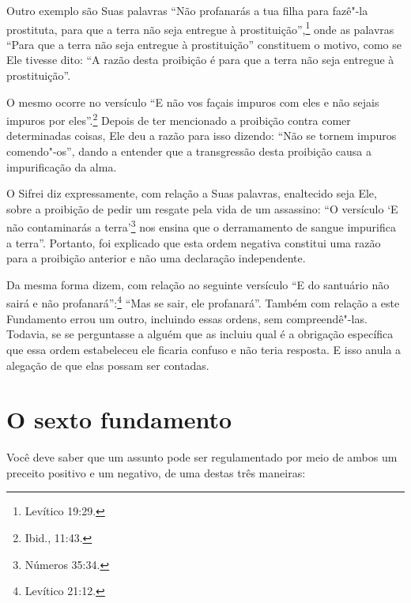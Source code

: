 Outro exemplo são Suas palavras ``Não profanarás a tua filha para
fazê"-la prostituta, para que a terra não seja entregue à prostituição'',\footnote{Levítico 19:29.} onde as palavras ``Para que a terra não seja entregue
à prostituição'' constituem o motivo, como se Ele tivesse dito: ``A
razão desta proibição é para que a terra não seja entregue à
prostituição''.

O mesmo ocorre no versículo ``E não vos façais impuros com eles e não
sejais impuros por eles''.\footnote{Ibid., 11:43.} Depois de ter mencionado a
proibição contra comer determinadas coisas, Ele deu a razão para isso
dizendo: ``Não se tornem impuros comendo"-os'', dando a entender que a
transgressão desta proibição causa a impurificação da alma.

O Sifrei\starr{} diz expressamente, com relação a Suas palavras, enaltecido seja
Ele, sobre a proibição de pedir um resgate pela vida de um assassino:
``O versículo `E não contaminarás a terra'\footnote{Números 35:34.} nos ensina
que o derramamento de sangue impurifica a terra''. Portanto, foi
explicado que esta ordem negativa constitui uma razão para a proibição
anterior e não uma declaração independente.


Da mesma forma dizem, com relação ao seguinte versículo ``E do
santuário não sairá e não profanará'':\footnote{Levítico 21:12.} ``Mas se sair,
ele profanará''.
Também com relação a este Fundamento errou um outro, incluindo essas
ordens, sem compreendê"-las. Todavia, se se perguntasse a alguém que as
incluiu qual é a obrigação específica que essa ordem estabeleceu ele
ficaria confuso e não teria resposta. E isso anula a alegação de que
elas possam ser contadas.

\chapter*{O sexto fundamento}

Você deve saber que um assunto pode ser regulamentado por meio de ambos
um preceito positivo e um negativo, de uma destas três maneiras:

